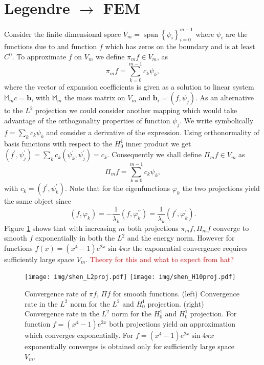 \documentclass[a4paper,10pt]{article}
\newcommand{\inner}[2]{\ensuremath{\left(#1, #2\right)}}
\newcommand{\Mmmat}{\ensuremath{\mathbb{M}_m}}               %
\newcommand{\bvec}{\ensuremath{\mathbf{b}}}
\newcommand{\TODO}[1]{\textcolor{red}{#1}}
\DeclareMathOperator{\spn}{span}
\begin{document}
 \section{Legendre $\rightarrow$ FEM}
 Consider the finite dimensional space $V_m=\spn\left\{\psi_i\right\}_{i=0}^{m-1}$
 where $\psi_i$ are the functions due to \cite{shen_leg} and function $f$
 which has zeros on the boundary and is at least $C^0$. To approximate $f$ on
 $V_m$ we define $\pi_m f\in V_m$,
 as
 \[
   \pi_m f = \displaystyle\sum\limits_{k=0}^{m-1}c_k \psi_k,
 \]
 where the vector of expansion coefficients is given as a solution to linear
 system $\Mmmat c=\bvec$, with $\Mmmat$ the mass matrix on $V_m$ and
 $\bvec_i=\inner{f}{\psi_j}$. As an alternative to the $L^2$ projection we
 could consider another mapping which would take advantage of the orthogonality
 properties of function $\psi_j$.
 We write symbolically $f=\sum_k c_k\psi_k$ and consider a derivative of the
 expression. Using orthonormality of basis functions with respect to the
 $H^1_0$ inner product we get $\inner{f^{\prime}}{\psi^{\prime}_j} =
 \sum_k c_k\inner{\psi^{\prime}_k}{\psi^{\prime}_j}=c_k$. Consequently
 we shall define $\Pi_m f\in V_m$ as
 \[
   \Pi_m f = \displaystyle\sum\limits_{k=0}^{m-1}c_k \psi_k,
 \]
 with $c_k=\inner{f^{\prime}}{\psi^{\prime}_k}$. Note that for the
 eigenfunctions $\varphi_k$ the two projections yield the same object since
 \[
   \inner{f}{\varphi_k} =
   -\frac{1}{\lambda_k}\inner{f}{\varphi^{\prime\prime}_k} =
   \frac{1}{\lambda_k}\inner{f^{\prime}}{\varphi_k^{\prime}}.
 \]
  Figure \ref{fig:shen_smooth_projection} shows that with increasing $m$ both
  projections $\pi_mf, \Pi_mf$ converge to smooth $f$ exponentially in both
  the $L^2$ and the energy norm. However for functions $f(x)=(x^4-1)e^{2x}\sin{4\pi x}$
  the exponential convergence requires sufficiently large space $V_m$.
  \TODO{Theory for this and what to expect from hat?}
  \begin{figure}
  \begin{center}
    \texttt{[image: img/shen\_L2proj.pdf]}
    \texttt{[image: img/shen\_H10proj.pdf]}
  \end{center}
  \label{fig:shen_smooth_projection}
  \caption{Convergence rate of $\pi f$,  $\Pi f$ for smooth functions.
    (left) Convergence rate in the $L^2$ norm for the $L^2$ and $H^1_0$
    projection. (right) Convergence rate in the $L^2$ norm for the $H^1_0$
    and $H^1_0$ projection. For function $f=(x^4-1)e^{2x}$ both projections
    yield an approximation which converges exponentially. For 
    $f=(x^4-1)e^{2x}\sin{4\pi x}$ exponentially converges is obtained only for
    sufficiently large space $V_m$.
  }
  \end{figure}
  
\end{document}
